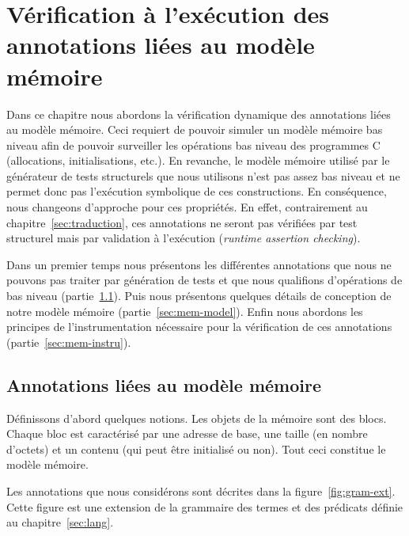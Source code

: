 
\chapter[Vérification liée au modèle mémoire]{Vérification à l'exécution des annotations liées au modèle mémoire}
\label{sec:runtime}

\chapterintro

Dans ce chapitre nous abordons la vérification dynamique des annotations liées
au modèle mémoire.
Ceci requiert de pouvoir simuler un modèle mémoire bas niveau afin de pouvoir
surveiller les opérations bas niveau des programmes C (allocations,
initialisations, etc.).
En revanche, le modèle mémoire utilisé par le générateur de tests structurels
que nous utilisons n'est pas assez bas niveau et ne permet donc pas l'exécution
symbolique de ces constructions.
En conséquence, nous changeons d'approche pour ces propriétés.
En effet, contrairement au chapitre~\ref{sec:traduction}, ces annotations ne
seront pas vérifiées par test structurel mais par validation à l'exécution
({\em runtime assertion checking}).

Dans un premier temps nous présentons les différentes annotations que nous ne
pouvons pas traiter par génération de tests et que nous qualifions d'opérations
de bas niveau (partie~\ref{sec:mem-annots}).
Puis nous présentons quelques détails de conception de notre modèle mémoire
(partie~\ref{sec:mem-model}).
Enfin nous abordons les principes de l'instrumentation nécessaire pour la
vérification de ces annotations (partie~\ref{sec:mem-instru}).


\section{Annotations liées au modèle mémoire}
\label{sec:mem-annots}


Définissons d'abord quelques notions.
Les objets de la mémoire sont des blocs.
Chaque bloc est caractérisé par une adresse de base, une taille (en nombre
d'octets) et un contenu (qui peut être initialisé ou non).
Tout ceci constitue le modèle mémoire.

Les annotations \eacsl que nous considérons sont décrites dans la
figure~\ref{fig:gram-ext}.
Cette figure est une extension de la grammaire des termes et des prédicats
\eacsl définie au chapitre~\ref{sec:lang}.


